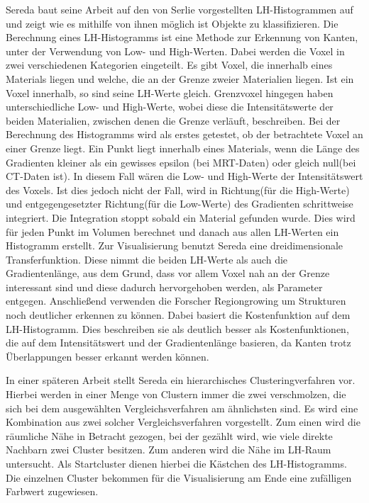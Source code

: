 Sereda baut seine Arbeit \cite{sereda2006visualization} auf den von Serlie \cite{serlie2003computed} vorgestellten LH-Histogrammen auf und zeigt wie es mithilfe von ihnen möglich ist Objekte zu klassifizieren.
\newline
Die Berechnung eines LH-Histogramms ist eine Methode zur Erkennung von Kanten, unter der Verwendung von Low- und High-Werten. Dabei werden die Voxel in zwei verschiedenen Kategorien eingeteilt.
\newline
Es gibt Voxel, die  innerhalb eines Materials liegen und welche, die  an der Grenze zweier Materialien liegen. Ist ein Voxel innerhalb, so sind seine LH-Werte gleich. Grenzvoxel hingegen haben unterschiedliche Low- und High-Werte, wobei diese die Intensitätswerte der beiden Materialien, zwischen denen die Grenze verläuft, beschreiben. 
\newline
Bei der Berechnung des Histogramms wird als erstes getestet, ob der betrachtete Voxel an einer Grenze liegt. Ein Punkt liegt innerhalb eines Materials, wenn  die Länge des Gradienten kleiner als ein gewisses epsilon (bei MRT-Daten) oder gleich null(bei CT-Daten ist). In diesem Fall wären die Low- und High-Werte der Intensitätswert des Voxels. Ist dies jedoch nicht der Fall, wird in Richtung(für die High-Werte) und entgegengesetzter Richtung(für die Low-Werte) des Gradienten schrittweise integriert. Die Integration stoppt sobald ein Material gefunden wurde. Dies wird für jeden Punkt im Volumen berechnet und danach aus allen LH-Werten ein Histogramm erstellt.
\newline 
Zur Visualisierung benutzt Sereda eine dreidimensionale Transferfunktion. Diese nimmt die beiden LH-Werte als auch die Gradientenlänge, aus dem Grund, dass vor allem Voxel nah an der Grenze interessant sind und diese dadurch hervorgehoben werden, als Parameter entgegen.
\newline
Anschließend verwenden die Forscher Regiongrowing um Strukturen noch deutlicher erkennen zu können. Dabei basiert die Kostenfunktion auf dem LH-Histogramm. Dies beschreiben sie als deutlich besser als Kostenfunktionen, die auf dem Intensitätswert und der Gradientenlänge basieren, da Kanten trotz Überlappungen besser erkannt werden können.


In einer späteren Arbeit \cite{sereda2006automating} stellt Sereda ein hierarchisches Clusteringverfahren vor. Hierbei werden in einer Menge von Clustern immer die zwei verschmolzen, die sich bei dem ausgewählten Vergleichsverfahren am ähnlichsten sind. Es wird eine Kombination aus zwei solcher Vergleichsverfahren vorgestellt.
\newline
Zum einen wird die räumliche Nähe in Betracht gezogen, bei der gezählt wird, wie viele direkte Nachbarn zwei Cluster besitzen. Zum anderen wird die Nähe im LH-Raum untersucht.
\newline
Als Startcluster dienen hierbei die Kästchen des LH-Histogramms. Die einzelnen Cluster bekommen für die Visualisierung am Ende eine zufälligen Farbwert zugewiesen. 


